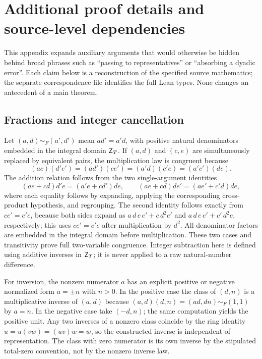\documentclass[11pt,reqno]{amsart}
\theoremstyle{definition}\newtheorem{definition}[theorem]{Definition}
\theoremstyle{remark}\newtheorem{remark}[theorem]{Remark}
\begin{document}
\appendix
\clearpage
\section{Additional proof details and source-level dependencies}\label{app:proofdetails}

This appendix expands auxiliary arguments that would otherwise be hidden behind broad phrases such as ``passing to representatives'' or ``absorbing a dyadic error''. Each claim below is a reconstruction of the specified source mathematics; the separate correspondence file identifies the full Lean types. None changes an antecedent of a main theorem.

\subsection{Fractions and integer cancellation}
Let $(a,d)\sim_F(a',d')$ mean $ad'=a'd$, with positive natural denominators embedded in the integral domain $\mathsf Z_T$. If $(a,d)$ and $(c,e)$ are simultaneously replaced by equivalent pairs, the multiplication law is congruent because
\[
 (ac)(d'e')=(ad')(ce')=(a'd)(c'e)=(a'c')(de).
\]
The addition relation follows from the two single-argument identities
\[
 (ae+cd)d'e=(a'e+cd')de,
 \qquad (ae+cd)de'=(ae'+c'd)de,
\]
where each equality follows by expanding, applying the corresponding cross-product hypothesis, and regrouping. The second identity follows exactly from $ce'=c'e$, because both sides expand as $a\,d\,e\,e'+c\,d^2e'$ and $a\,d\,e\,e'+c'\,d^2e$, respectively; this uses $ce'=c'e$ after multiplication by $d^2$. All denominator factors are embedded in the integral domain before multiplication. These two cases and transitivity prove full two-variable congruence. Integer subtraction here is defined using additive inverses in $\mathsf Z_T$; it is never applied to a raw natural-number difference.

For inversion, the nonzero numerator $a$ has an explicit positive or negative normalized form $a=\pm n$ with $n>0$. In the positive case the class of $(d,n)$ is a multiplicative inverse of $(a,d)$ because $(a,d)(d,n)=(ad,dn)\sim_F(1,1)$ by $a=n$. In the negative case take $(-d,n)$; the same computation yields the positive unit. Any two inverses of a nonzero class coincide by the ring identity $u=u(vw)=(uv)w=w$, so the constructed inverse is independent of representation. The class with zero numerator is its own inverse by the stipulated total-zero convention, not by the nonzero inverse law.
\end{document}
